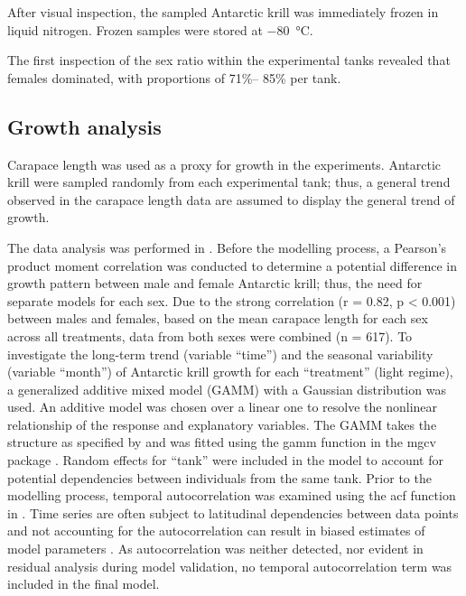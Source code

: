 After visual inspection, the sampled Antarctic krill was immediately frozen in
liquid nitrogen. Frozen samples were stored at \SI{-80}{\celsius}.

The first inspection of the sex ratio within the experimental tanks revealed
that females dominated, with proportions of 71\%– 85\% per tank. 

\subsection{Growth analysis} 

Carapace length was used as a proxy for growth in the experiments. Antarctic
krill were sampled randomly from each experimental tank; thus, a general trend
observed in the carapace length data are assumed to display the general trend
of growth. 

The data analysis was performed in 
\citep{rstudio_team_rstudio:_2016}. Before the modelling process, a Pearson’s
product moment correlation was conducted to determine a potential difference in
growth pattern between male and female Antarctic krill; thus, the need for
separate models for each sex.  Due to the strong correlation (r = 0.82, p <
0.001) between males and females, based on the mean carapace length for each
sex across all treatments, data from both sexes were combined (n = 617). To
investigate the long-term trend (variable “time”) and the seasonal variability
(variable “month”) of Antarctic krill growth for each “treatment” (light
regime), a generalized additive mixed model (GAMM) with a Gaussian distribution
was used. An additive model was chosen over a linear one to resolve the
nonlinear relationship of the response and explanatory variables. The GAMM
takes the structure as specified by \citet{hastie_generalized_1987} and was
fitted using the gamm function in the mgcv package
\citep{wood_generalized_2006}. Random effects for “tank” were included in the
model to account for potential dependencies between individuals from the same
tank.  Prior to the modelling process, temporal autocorrelation was examined
using the acf function in . Time series are often subject to
latitudinal dependencies between data points and not accounting for the
autocorrelation can result in biased estimates of model parameters
\citep{panigada_modelling_2008}. As autocorrelation was neither detected, nor
evident in residual analysis during model validation, no temporal
autocorrelation term was included in the final model. 


